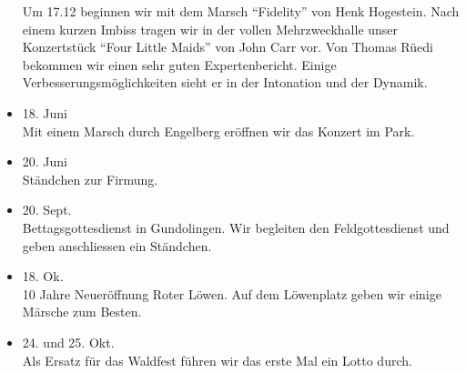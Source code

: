 \begin{history}
\begin{itemize}
              Um 17.12 beginnen wir
              mit dem Marsch \enquote{Fidelity} von Henk Hogestein. Nach einem kurzen
              Imbiss tragen wir in der vollen Mehrzweckhalle unser Konzertstück
              \enquote{Four Little Maids} von John Carr vor. Von Thomas Rüedi bekommen
              wir einen sehr guten Expertenbericht. Einige Verbesserungsmöglichkeiten
              sieht er in der Intonation und der Dynamik.

        \item 18. Juni\\
              Mit einem Marsch durch Engelberg eröffnen wir das Konzert im Park.

        \item 20. Juni\\
              Ständchen zur Firmung.

        \item 20. Sept.\\
              Bettagsgottesdienst in Gundolingen. Wir begleiten den Feldgottesdienst
              und geben anschliessen ein Ständchen.

        \item 18. Ok.\\
              10 Jahre Neueröffnung Roter Löwen. Auf dem Löwenplatz geben wir einige
              Märsche zum Besten.

        \item 24. und 25. Okt.\\
              Als Ersatz für das Waldfest führen wir das erste Mal ein Lotto durch.


    \end{itemize}

\end{history}
